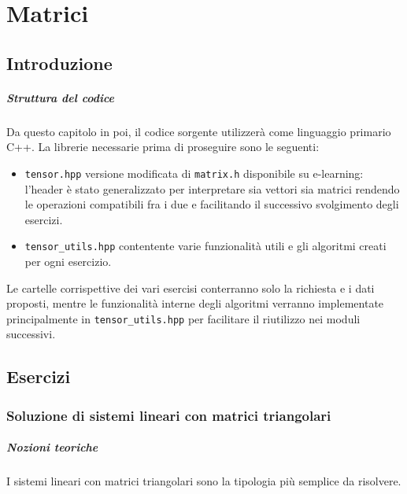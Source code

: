 \setchapterpreamble[u]{\margintoc}
\chapter{Matrici}

\section{Introduzione}

\paragraph{Struttura del codice}

Da questo capitolo in poi, il codice sorgente utilizzerà come linguaggio primario
C++. La librerie necessarie prima di proseguire sono le seguenti:

\begin{itemize}
	\item \texttt{tensor.hpp} versione modificata di \texttt{matrix.h} disponibile
	      su e-learning: l'header è stato generalizzato per interpretare sia
	      vettori sia matrici rendendo le operazioni compatibili fra i due e
	      facilitando il successivo svolgimento degli esercizi.
	\item \texttt{tensor\_utils.hpp} contentente varie funzionalità utili e 
	      gli algoritmi creati per ogni esercizio.
\end{itemize}

Le cartelle corrispettive dei vari esercisi conterranno solo la richiesta e i dati
proposti, mentre le funzionalità interne degli algoritmi verranno implementate
principalmente in \texttt{tensor\_utils.hpp} per facilitare il riutilizzo nei moduli
successivi.

\section{Esercizi}

\subsection{Soluzione di sistemi lineari con matrici triangolari}

\paragraph{Nozioni teoriche}

I sistemi lineari con matrici triangolari sono la tipologia più semplice da risolvere.

